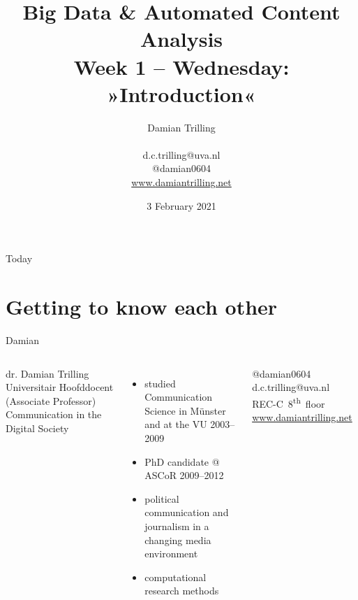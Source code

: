 \documentclass{beamer}
\title[Big Data and Automated Content Analysis]{\textbf{Big Data \& Automated Content Analysis} \\ Week 1 -- Wednesday: »Introduction«}
\author[Damian Trilling]{Damian Trilling \\ ~ \\ \footnotesize{d.c.trilling@uva.nl \\@damian0604} \\ \url{www.damiantrilling.net}}
\date{3 February 2021}
\institute[UvA]{Afdeling Communicatiewetenschap \\Universiteit van Amsterdam}
\begin{document}
\begin{frame}{}
\titlepage
\end{frame}

\begin{frame}{Today}
\tableofcontents
\end{frame}


\section{Getting to know each other}

\begin{frame}{Damian}

	\begin{columns}
		dr. Damian Trilling \\
        Universitair Hoofddocent (Associate Professor) Communication in the Digital Society \\
		\begin{itemize}
			\item studied Communication Science in M\"unster and at the VU 2003--2009
			\item PhD candidate @ ASCoR 2009--2012
			\item political communication and journalism in a changing media environment
			\item computational research methods
		\end{itemize}
		@damian0604 ~~ d.c.trilling@uva.nl ~~ REC-C~8\textsuperscript{th}~floor ~~ \url{www.damiantrilling.net} 
	\end{columns}
\end{frame}
\end{document}
